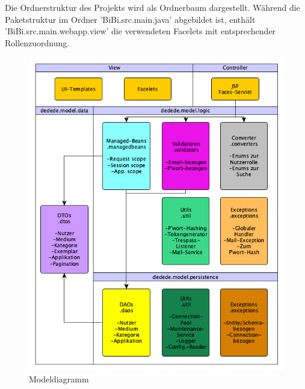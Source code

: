 \documentclass{article}
\begin{document}
Die Ordnerstruktur des Projekts wird als Ordnerbaum dargestellt.
Während die Paketstruktur im Ordner 'BiBi.src.main.java' abgebildet ist, enthält 'BiBi.src.main.webapp.view' die verwendeten Facelets mit entsprechender Rollenzuordnung. \vspace{0.5em}

\begin{figure}[H]
\hypertarget{DAOs}{}
\centering
\includegraphics[width = 40em]{Modeldiagramm}
\caption{Modeldiagramm}
\end{figure}	
	
\end{document}
